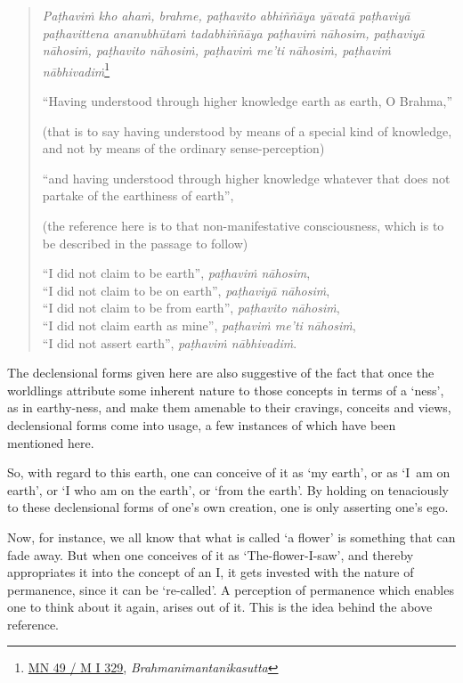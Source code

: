 \begin{quote}
\emph{Paṭhaviṁ kho ahaṁ, brahme, paṭhavito abhiññāya yāvatā paṭhaviyā paṭhavittena ananubhūtaṁ tadabhiññāya paṭhaviṁ nāhosim, paṭhaviyā nāhosiṁ, paṭhavito nāhosiṁ, paṭhaviṁ me'ti nāhosiṁ, paṭhaviṁ nābhivadiṁ}\footnote{\href{https://suttacentral.net/mn49/pli/ms}{MN 49 / M I 329}, \emph{Brahmanimantanikasutta}}

``Having understood through higher knowledge earth as earth, O Brahma,''

(that is to say having understood by means of a special kind of knowledge, and not by means of the ordinary sense-perception)

``and having understood through higher knowledge whatever that does not partake of the earthiness of earth'',

(the reference here is to that non-manifestative consciousness, which is to be described in the passage to follow)

``I did not claim to be earth'', \emph{paṭhaviṁ nāhosim},\\
``I did not claim to be on earth'', \emph{paṭhaviyā nāhosiṁ},\\
``I did not claim to be from earth'', \emph{paṭhavito nāhosiṁ},\\
``I did not claim earth as mine'', \emph{paṭhaviṁ me'ti nāhosiṁ},\\
``I did not assert earth'', \emph{paṭhaviṁ nābhivadiṁ}.
\end{quote}

The declensional forms given here are also suggestive of the fact that once the worldlings attribute some inherent nature to those concepts in terms of a `ness', as in earthy-ness, and make them amenable to their cravings, conceits and views, declensional forms come into usage, a few instances of which have been mentioned here.

So, with regard to this earth, one can conceive of it as `my earth', or as `I~am on earth', or `I who am on the earth', or `from the earth'. By holding on tenaciously to these declensional forms of one's own creation, one is only asserting one's ego.

Now, for instance, we all know that what is called `a flower' is something that can fade away. But when one conceives of it as `The-flower-I-saw', and thereby appropriates it into the concept of an I, it gets invested with the nature of permanence, since it can be `re-called'. A perception of permanence which enables one to think about it again, arises out of it. This is the idea behind the above reference.


